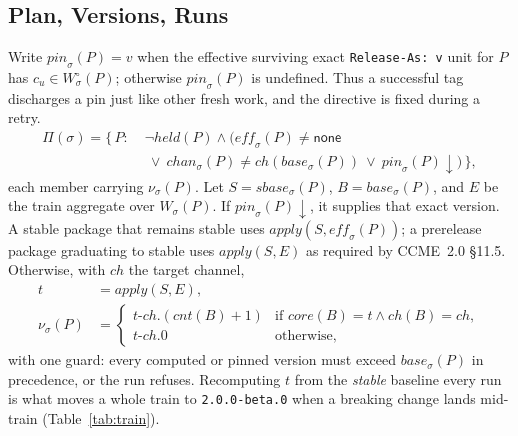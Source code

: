 \documentclass[sigconf,nonacm]{acmart}
\newcommand{\code}[1]{\texttt{#1}}
\begin{document}
\subsection{Plan, Versions, Runs}

\begin{definition}
\label{def:plan}
Write $\mathit{pin}_\sigma(P)=v$ when the effective surviving exact
\code{Release-As: v} unit for $P$ has $c_u\in W^\circ_\sigma(P)$; otherwise
$\mathit{pin}_\sigma(P)$ is undefined. Thus a successful tag discharges a
pin just like other fresh work, and the directive is fixed during a retry.
\begin{equation}
\begin{aligned}
  \Pi(\sigma) = \{\, P :\;
    &\lnot\mathit{held}(P) \wedge (\mathit{eff}_\sigma(P) \neq
     \mathsf{none} \\[-1mm]
    &\ \lor\ \mathit{chan}_\sigma(P) \neq
     \mathit{ch}(\mathit{base}_\sigma(P))
     \ \lor\ \mathit{pin}_\sigma(P)\downarrow) \,\},
\end{aligned}
\end{equation}
each member carrying $\nu_\sigma(P)$. Let $S=\mathit{sbase}_\sigma(P)$,
$B=\mathit{base}_\sigma(P)$, and $E$ be the train aggregate over $W_\sigma(P)$.
If $\mathit{pin}_\sigma(P)\downarrow$, it supplies that exact version. A stable package that
remains stable uses $\mathit{apply}(S,\mathit{eff}_\sigma(P))$; a prerelease
package graduating to stable uses $\mathit{apply}(S,E)$ as required by
CCME~2.0 \S11.5. Otherwise, with $\mathit{ch}$ the target channel,
\begin{equation}
\label{eq:train}
\begin{aligned}
  t &= \mathit{apply}(S, E), \\
  \nu_\sigma(P) &=
  \begin{cases}
    t\text{-}\mathit{ch}.(\mathit{cnt}(B){+}1)
      & \text{if } \mathit{core}(B) = t \wedge \mathit{ch}(B) =
        \mathit{ch},\\
    t\text{-}\mathit{ch}.0 & \text{otherwise,}
  \end{cases}
\end{aligned}
\end{equation}
with one guard: every computed or pinned version must exceed
$\mathit{base}_\sigma(P)$ in precedence, or the run refuses. Recomputing
$t$ from the \emph{stable} baseline every run is what moves a whole
train to \code{2.0.0-beta.0} when a breaking change lands mid-train
(Table~\ref{tab:train}).

\end{definition}
\end{document}
